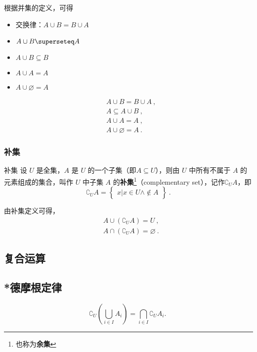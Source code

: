 根据并集的定义，可得
\begin{itemize}
\item 交换律：$A\cup B = B\cup A$
\item $A\cup B \superseteq A$
\item $A\cup B \subseteq B$
\item $A\cup A = A$
\item $A\cup \varnothing = A$
\end{itemize}
\begin{equation}
\begin{aligned}
&A\cup B = B\cup A~, \\
&A\subseteq A\cup B ~,\\
&A\cup A = A ~,\\
&A\cup \varnothing = A~.
\end{aligned}
\end{equation}

\subsubsection{补集}
\begin{definition}{补集}
设 $U$ 是全集，$A$ 是 $U$ 的一个子集（即$A\subseteq U$），则由 $U$ 中所有不属于 $A$ 的元素组成的集合，叫作 $U$ 中子集 $A$ 的\textbf{补集}\footnote{也称为\textbf{余集}}（complementary set），记作$\complement_UA$，即
\begin{equation}
\complement_UA = \begin{Bmatrix}x|x\in U \wedge \notin A\end{Bmatrix}~.
\end{equation}
\end{definition}

由补集定义可得，
\begin{equation}
\begin{aligned}
&A\cup (\complement_UA) = U~, \\
&A\cap (\complement_UA) = \varnothing~.
\end{aligned}
\end{equation}
\subsection{复合运算}

\subsection{*德摩根定律}


\begin{equation}
\complement_U(\bigcup_{i\in I} A_i)=\bigcap_{i\in I} \complement_UA_i.~
\end{equation}

